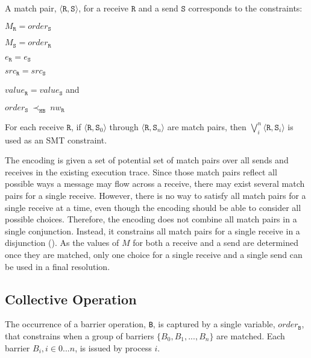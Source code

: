 \begin{definition} \label{def:match}
A match pair, $\langle\mathtt{R}, \mathtt{S}\rangle$, for a receive
$\mathtt{R}$ and a send $\mathtt{S}$ corresponds to the constraints:
\begin{compactenum}
\item $M_{\mathtt{R}} = \mathit{order}_{\mathtt{S}}$
\item $M_{\mathtt{S}} = \mathit{order}_{\mathtt{R}}$
\item $e_{\mathtt{R}} = e_{\mathtt{S}}$
\item $src_\mathtt{R} = src_\mathtt{S}$
\item $\mathit{value}_{\mathtt{R}} = \mathit{value}_{\mathtt{S}}$ and
\item $\mathit{order}_{\mathtt{S}}\ \mathrm{\prec_\mathtt{HB}}\ \mathit{nw}_{\mathtt{R}}$
\end{compactenum}
\end{definition}

\begin{definition} \label{def:receive_match}
For each receive $\mathtt{R}$, if $\langle\mathtt{R},
\mathtt{S}_0\rangle$ through $\langle\mathtt{R}, \mathtt{S}_n\rangle$
are match pairs, then $\bigvee_{i}^{n} \langle\mathtt{R},
\mathtt{S}_i\rangle$ is used as an SMT constraint.
\end{definition}

The encoding is given a set of potential set of match pairs over all sends and receives in the existing execution trace. Since those match pairs reflect all possible ways a message may flow across a receive, there may exist several match pairs for a single receive. However, there is no way to satisfy all match pairs for a single receive at a time, even though the encoding should be able to consider all possible choices. Therefore, the encoding does not combine all match pairs in a single conjunction. Instead, it constrains all match pairs for a single receive in a disjunction (). As the values of $M$ for both a receive and a send are determined once they are matched, only one choice for a single receive and a single send can be used in a final resolution.

\subsection{Collective Operation}

\begin{definition}[Barrier]\label{def:barrier}
The occurrence of a barrier operation, \texttt{B}, is captured by a
single variable, $\mathit{order}_\mathtt{B}$, that constrains when a group of barriers $\{B_0, B_1, ..., B_n\}$ are matched.  
Each barrier $B_i, i\in{0 ... n}$, is issued by process $i$. 
\end{definition}

